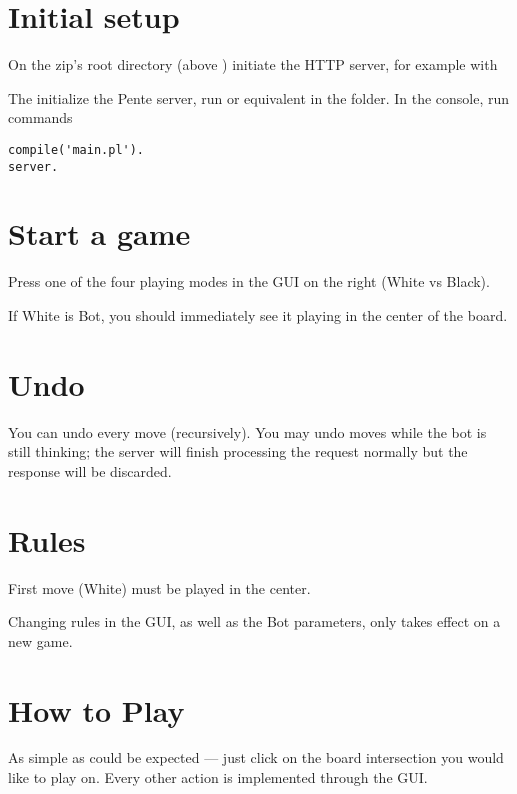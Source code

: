 \documentclass[compilation.tex]{subfiles}
\begin{document}
	
\section{Initial setup}

On the zip's root directory (above ) initiate the HTTP server, for example with 

The initialize the Pente server, run  or equivalent in the  folder. In the  console, run commands

\begin{center}
\begin{minipage}[c]{.25\textwidth}
\ttfamily
\begin{verbatim}
compile('main.pl').
server.	
\end{verbatim}
\end{minipage}
\end{center}

\section{Start a game}

Press one of the four playing modes in the GUI on the right (White vs Black).

If White is Bot, you should immediately see it playing in the center of the board.

\section{Undo}

You can undo every move (recursively). You may undo moves while the bot is still thinking;
the server will finish processing the request normally but the response will be discarded.

\section{Rules}

First move (White) must be played in the center.

Changing rules in the GUI, as well as the Bot parameters, only takes effect on a new game.

\section{How to Play}

As simple as could be expected --- just click on the board intersection you would like to play on.
Every other action is implemented through the GUI.
\end{document}
